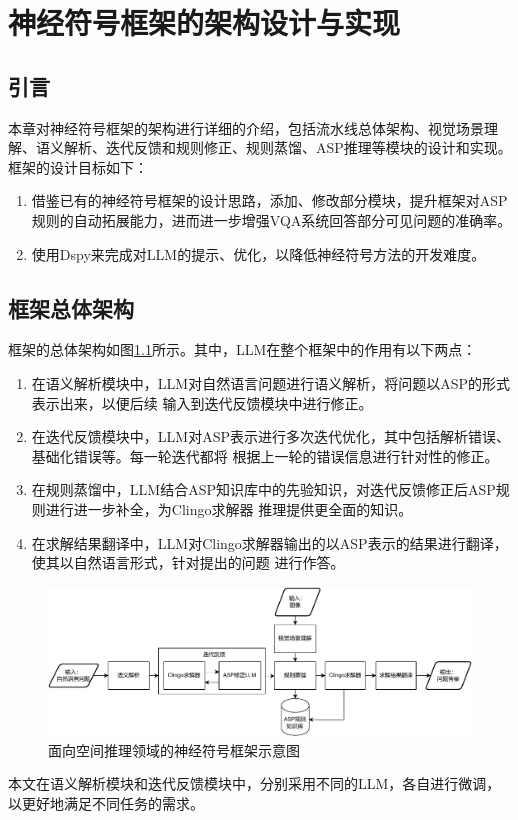 \chapter{神经符号框架的架构设计与实现}
\section{引言}
本章对神经符号框架的架构进行详细的介绍，包括流水线总体架构、视觉场景理解、语义解析、迭代反馈和规则修正、规则蒸馏、ASP推理等模块的设计和实现。
框架的设计目标如下：
\begin{enumerate}[label=(\arabic*),itemsep=0pt,parsep=0pt]
\item 借鉴已有的神经符号框架的设计思路，添加、修改部分模块，提升框架对ASP规则的自动拓展能力，进而进一步增强VQA系统回答部分可见问题的准确率。
\item 使用Dspy来完成对LLM的提示、优化，以降低神经符号方法的开发难度。
\end{enumerate}
\section{框架总体架构}
框架的总体架构如图\ref{fig:pipeline}所示。其中，LLM在整个框架中的作用有以下两点：
\begin{enumerate}[label=(\arabic*),itemsep=0pt,parsep=0pt]
    \item 在语义解析模块中，LLM对自然语言问题进行语义解析，将问题以ASP的形式表示出来，以便后续
输入到迭代反馈模块中进行修正。
    \item 在迭代反馈模块中，LLM对ASP表示进行多次迭代优化，其中包括解析错误、基础化错误等。每一轮迭代都将
根据上一轮的错误信息进行针对性的修正。
    \item 在规则蒸馏中，LLM结合ASP知识库中的先验知识，对迭代反馈修正后ASP规则进行进一步补全，为Clingo求解器
推理提供更全面的知识。
    \item 在求解结果翻译中，LLM对Clingo求解器输出的以ASP表示的结果进行翻译，使其以自然语言形式，针对提出的问题
进行作答。
\end{enumerate}
\begin{figure}
    \centering
    \includegraphics[width=\textwidth]{figures/pipeline-crop.pdf}
    \caption{面向空间推理领域的神经符号框架示意图}
    \label{fig:pipeline}
\end{figure}
本文在语义解析模块和迭代反馈模块中，分别采用不同的LLM，各自进行微调，以更好地满足不同任务的需求。
